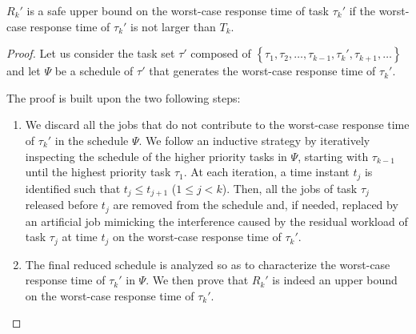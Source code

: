 \begin{theorem}
\label{theorem:critical}
 $R_k'$ is a safe upper bound on the worst-case response time of task $\tau_k'$ if the worst-case response time of $\tau_k'$ is not larger than $T_k$.
\end{theorem}
\begin{proof}
Let us consider the task set $\tau'$ composed of $\left\{\tau_1, \tau_2, \ldots, \tau_{k-1}, \tau_k', \tau_{k+1}, \ldots \right\}$ and let $\Psi$ be a schedule of $\tau'$ that generates the worst-case response time of $\tau_k'$.  

The proof is built upon the two following steps:
\begin{enumerate}
\item We discard all the jobs that do not contribute to the worst-case response time of $\tau_k'$ in the schedule $\Psi$. We follow an inductive strategy by iteratively inspecting the schedule of the higher priority tasks in $\Psi$, starting with $\tau_{k-1}$ until the highest priority task $\tau_1$. At each iteration, a time instant $t_j$ is identified such that $t_j \leq t_{j+1}$ ($1 \leq j < k$). Then, all the jobs of task $\tau_j$ released before $t_j$ are removed from the schedule and, if needed, replaced by an artificial job mimicking the interference caused by the residual workload of task $\tau_j$ at time $t_j$ on the worst-case response time of $\tau_{k}'$. 
\item The final reduced schedule is analyzed so as to characterize the worst-case response time of $\tau_k'$ in $\Psi$. We then prove that $R_k'$ is indeed an upper bound on the worst-case response time of $\tau_k'$.
\end{enumerate}




\end{proof}
